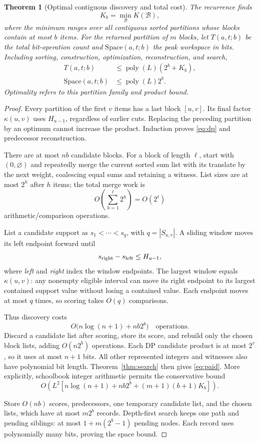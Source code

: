 \documentclass[10pt]{article}
\newtheorem{theorem}{Theorem}
\newcommand{\poly}{\operatorname{poly}}
\begin{document}
\begin{samepage}
\begin{theorem}[Optimal contiguous discovery and total cost]\label{thm:paid}
The recurrence finds
\[
 K_b=\min_{\mathcal B}K(\mathcal B),
\]
where the minimum ranges over all contiguous sorted partitions
whose blocks contain at most $b$ items.
For the returned partition of $m$ blocks, let $T(a,t;b)$ be the total bit-operation count and
$\mathrm{Space}(a,t;b)$ the peak workspace in bits.
Including sorting, construction, optimization, reconstruction, and search,
\begin{equation}\label{eq:paid}
 \boxed{\begin{aligned}
 T(a,t;b)&\le\poly(L)(2^b+K_b),\\
 \mathrm{Space}(a,t;b)&\le\poly(L)2^b.
 \end{aligned}}
\end{equation}
Optimality refers to this partition family and product bound.
\end{theorem}
\end{samepage}
\begin{proof}
Every partition of the first $v$ items has a last block $[u,v]$.
Its final factor $\kappa(u,v)$ uses $H_{u-1}$, regardless of earlier cuts.
Replacing the preceding partition by an optimum cannot increase the
product. Induction proves \eqref{eq:dp} and predecessor reconstruction.

There are at most $nb$ candidate blocks. For a block of length $\ell$,
start with $(0,\varnothing)$ and repeatedly merge the current sorted
sum list with its translate by the next weight, coalescing equal sums
and retaining a witness. List sizes are at most $2^h$ after $h$ items;
the total merge work is
\[
 O\!\left(\sum_{h=1}^{\ell}2^h\right)=O(2^\ell)
\]
arithmetic/comparison operations.

List a candidate support as $s_1<\cdots<s_q$, with $q=|S_{u,v}|$.
A sliding window moves its left endpoint forward until
\[
 s_{\rm right}-s_{\rm left}\le H_{u-1},
\]
where \emph{left} and \emph{right} index the window endpoints.
The largest window equals $\kappa(u,v)$: any nonempty eligible interval
can move its right endpoint to its largest contained support value
without losing a contained value. Each endpoint moves at most $q$ times,
so scoring takes $O(q)$ comparisons.

Thus discovery costs
\[
 O\bigl(n\log(n+1)+nb2^b\bigr)\quad\text{operations}.
\]
Discard a candidate list after scoring, store its score, and rebuild only
the chosen block lists, adding $O(n2^b)$ operations. Each DP candidate
product is at most $2^v$, so it uses at most $n+1$ bits.
All other represented integers and witnesses also have polynomial bit length.
Theorem~\ref{thm:search} then gives \eqref{eq:paid}.
More explicitly, schoolbook integer arithmetic permits the conservative bound
\[
 O\!\left(L^2\left[n\log(n+1)+nb2^b+(m+1)(b+1)K_b\right]\right).
\]

Store $O(nb)$ scores, predecessors, one temporary candidate list, and the
chosen lists, which have at most $m2^b$ records. Depth-first search keeps
one path and pending siblings: at most $1+m(2^b-1)$ pending nodes.
Each record uses polynomially many bits, proving the space bound.
\end{proof}
\end{document}
